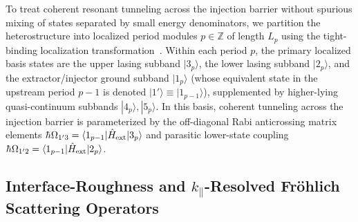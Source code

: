 \documentclass[11pt,letterpaper]{article}
\renewcommand{\hbar}{\mathchar'26\mkern-9mu h}
\begin{document}
To treat coherent resonant tunneling across the injection barrier without spurious mixing of states separated by small energy denominators, we partition the heterostructure into localized period modules $p \in \mathbb{Z}$ of length $L_p$ using the tight-binding localization transformation~\cite{Kazarinov1972,Terazzi2010,DemicRoadmap2025}. Within each period $p$, the primary localized basis states are the upper lasing subband $|3_p\rangle$, the lower lasing subband $|2_p\rangle$, and the extractor/injector ground subband $|1_p\rangle$ (whose equivalent state in the upstream period $p-1$ is denoted $|1'\rangle \equiv |1_{p-1}\rangle$), supplemented by higher-lying quasi-continuum subbands $|4_p\rangle, |5_p\rangle$. In this basis, coherent tunneling across the injection barrier is parameterized by the off-diagonal Rabi anticrossing matrix elements $\hbar\Omega_{1'3} = \langle 1_{p-1}|\hat{H}_{\mathrm{ext}}|3_p\rangle$ and parasitic lower-state coupling $\hbar\Omega_{1'2} = \langle 1_{p-1}|\hat{H}_{\mathrm{ext}}|2_p\rangle$.

\subsection{Interface-Roughness and $k_\parallel$-Resolved Fr\"ohlich Scattering Operators}
\label{subsec:scattering_operators}
\end{document}
